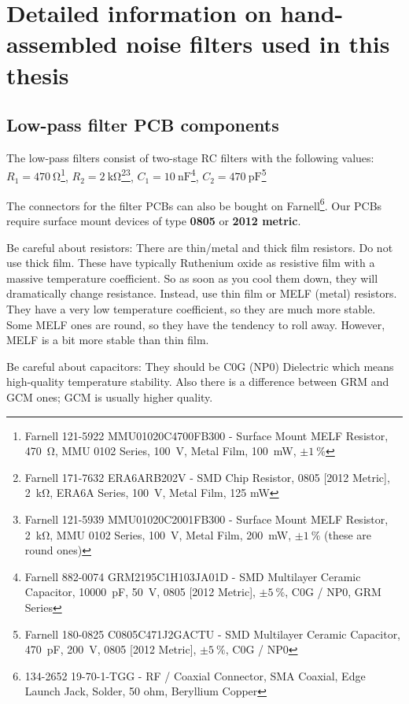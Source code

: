 \chapter{Detailed information on hand-assembled noise filters used in this thesis}

\section{Low-pass filter PCB components}\label{app:lowpassfilter}

The low-pass filters consist of two-stage RC filters with the following values:
$R_1=\SI{470}{\ohm}$\footnote{Farnell 121-5922 MMU01020C4700FB300 - Surface Mount MELF Resistor, \SI{470}{\ohm}, MMU 0102 Series, \SI{100}{V}, Metal Film, \SI{100}{\milli\watt}, $\pm\SI{1}{\percent}$}, $R_2=\SI{2}{\kilo\ohm}$\footnote{Farnell 171-7632 ERA6ARB202V - SMD Chip Resistor, 0805 [2012 Metric], \SI{2}{\kilo\ohm}, ERA6A Series, \SI{100}{V}, Metal Film, 125 mW}\footnote{Farnell 121-5939 MMU01020C2001FB300 - Surface Mount MELF Resistor, \SI{2}{\kilo\ohm}, MMU 0102 Series, \SI{100}{V}, Metal Film, \SI{200}{\milli\watt}, $\pm\SI{1}{\percent}$ (these are round ones)}, $C_1=\SI{10}{\nano\farad}$\footnote{Farnell 882-0074 GRM2195C1H103JA01D - SMD Multilayer Ceramic Capacitor, \SI{10000}{\pico\farad}, \SI{50}{V}, 0805 [2012 Metric], $\pm\SI{5}{\percent}$, C0G / NP0, GRM Series}, $C_2=\SI{470}{\pico\farad}$\footnote{Farnell 180-0825 C0805C471J2GACTU - SMD Multilayer Ceramic Capacitor, \SI{470}{\pico\farad}, \SI{200}{V}, 0805 [2012 Metric], $\pm\SI{5}{\percent}$, C0G / NP0}

The connectors for the filter PCBs can also be bought on Farnell\footnote{134-2652 19-70-1-TGG - RF / Coaxial Connector, SMA Coaxial, Edge Launch Jack, Solder, 50 ohm, Beryllium Copper}. Our PCBs require surface mount devices of type \textbf{0805} or \textbf{2012 metric}.

Be careful about resistors: There are thin/metal and thick film resistors. Do not use thick film. These have typically Ruthenium oxide as resistive film with a massive temperature coefficient. So as soon as you cool them down, they will dramatically change resistance. Instead, use thin film or MELF (metal) resistors. They have a very low temperature coefficient, so they are much more stable. Some MELF ones are round, so they have the tendency to roll away. However, MELF is a bit more stable than thin film.

Be careful about capacitors: They should be C0G (NP0) Dielectric which means high-quality temperature stability. Also there is a difference between GRM and GCM ones; GCM is usually higher quality.

